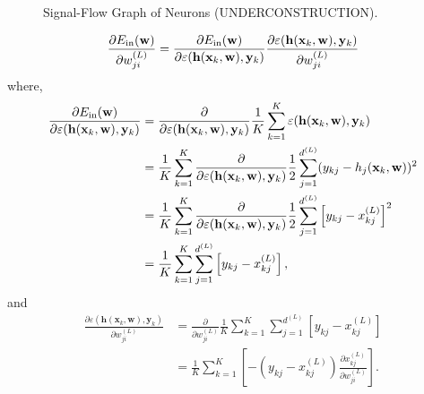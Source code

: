 \begin{landscape}
\begin{figure}
\caption[Signal-Flow Graph of Neurons]{\sc Signal-Flow Graph of Neurons (UNDERCONSTRUCTION).}
\end{figure}
\end{landscape}
\begin{equation}
\frac{\partial E_{\mathrm{in}}(\mathbf{w})}{\partial w_{ji}^{(L)}}=\frac{\partial E_{\mathrm{in}}(\mathbf{w})}{\partial \varepsilon(\mathbf{h}(\mathbf{x}_k,\mathbf{w}),\mathbf{y}_{k})}\frac{\partial \varepsilon(\mathbf{h}(\mathbf{x}_k,\mathbf{w}),\mathbf{y}_{k})}{\partial w_{ji}^{(L)}}
\end{equation}
where,
\begin{align}
\frac{\partial E_{\mathrm{in}}(\mathbf{w})}{\partial \varepsilon(\mathbf{h}(\mathbf{x}_k,\mathbf{w}),\mathbf{y}_{k})}&=\frac{\partial}{\partial \varepsilon(\mathbf{h}(\mathbf{x}_k,\mathbf{w}),\mathbf{y}_{k})}\frac{1}{K}\sum_{k=1}^{K}\varepsilon(\mathbf{h}(\mathbf{x}_k,\mathbf{w}),\mathbf{y}_k)\nonumber\\
&=\frac{1}{K}\sum_{k=1}^{K}\frac{\partial}{\partial \varepsilon(\mathbf{h}(\mathbf{x}_k,\mathbf{w}),\mathbf{y}_{k})}\frac{1}{2}\sum_{j=1}^{d^{(L)}}(y_{kj}-h_j(\mathbf{x}_k,\mathbf{w}))^2\nonumber\\
&=\frac{1}{K}\sum_{k=1}^{K}\frac{\partial}{\partial \varepsilon(\mathbf{h}(\mathbf{x}_k,\mathbf{w}),\mathbf{y}_{k})}\frac{1}{2}\sum_{j=1}^{d^{(L)}}\left[y_{kj}-x_{kj}^{(L)}\right]^2\nonumber\\
&=\frac{1}{K}\sum_{k=1}^{K}\sum_{j=1}^{d^{(L)}}\left[y_{kj}-x_{kj}^{(L)}\right],\label{eq:err}
\end{align}
and
\begin{align}
\frac{\partial \varepsilon(\mathbf{h}(\mathbf{x}_k,\mathbf{w}),\mathbf{y}_{k})}{\partial w_{ji}^{(L)}}&=\frac{\partial}{\partial w_{ji}^{(L)}}\frac{1}{K}\sum_{k=1}^{K}\sum_{j=1}^{d^{(L)}}\left[y_{kj}-x_{kj}^{(L)}\right]\nonumber\\
&=\frac{1}{K}\sum_{k=1}^{K}\left[-\left(y_{kj}-x_{kj}^{(L)}\right)\frac{\partial x_{kj}^{(L)}}{\partial w_{ji}^{(L)}}\right].\label{eq:inerr}
\end{align}
